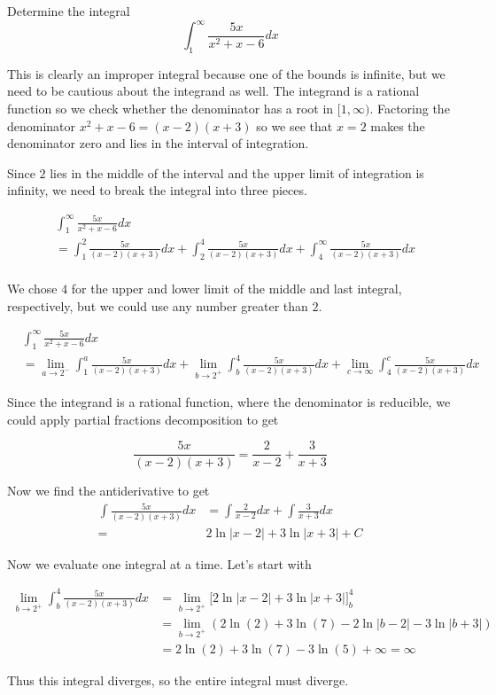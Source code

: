 \documentclass{ximera}
\begin{document}
\begin{example}
Determine the integral
\[
\int_{1}^{\infty} \frac{5x}{x^2+x-6} dx 
\]


\begin{explanation}
This is clearly an improper integral because one of the bounds is infinite, but we need to be cautious about the integrand as well. The integrand is a rational function so we check whether the denominator has a root in $[1,\infty)$.  Factoring the denominator $x^2+x-6=(x-2)(x+3)$ so we see that $x=2$ makes the denominator zero and lies in the interval of integration. 

Since $2$ lies in the middle of the interval and the upper limit of integration is infinity, we need to break the integral into three pieces.

\begin{align*}
& \int_{1}^{\infty} \frac{5x}{x^2+x-6} dx \\
&= \int_{1}^{2} \frac{5x}{(x-2)(x+3)} dx  + \int_{2}^{4} \frac{5x}{(x-2)(x+3)} dx + \int_{4}^{\infty} \frac{5x}{(x-2)(x+3)} dx\\
\end{align*}

We chose $4$ for the upper and lower limit of the middle and last integral, respectively, but we could use any number greater than $2$.

\begin{align*}
 & \int_{1}^{\infty} \frac{5x}{x^2+x-6} dx \\
        &=\lim_{a \to 2^{-}} \int_{1}^a \frac{5x}{(x-2)(x+3)} dx + \lim_{b \to 2^{+}} \int_{b}^{4} \frac{5x}{(x-2)(x+3)} dx +\lim_{c \to \infty} \int_{4}^{c} \frac{5x}{(x-2)(x+3)} dx
\end{align*}

Since the integrand is a rational function, where the denominator is reducible, we could apply partial fractions decomposition to get

\[
\frac{5x}{(x-2)(x+3)}=\frac{ 2}{x-2} +\frac{ 3}{x+3}
\]


Now we find the antiderivative to get 
\begin{align*}
\int \frac{5x}{(x-2)(x+3)} dx&=\int \frac{ 2}{x-2} dx + \int \frac{ 3}{x+3} dx \\
=& 2\ln|x-2| + 3\ln|x+3 | + C
\end{align*}


Now we evaluate one integral at a time.  Let's start with

\begin{align*}
\lim_{b \to 2^{+}} \int_{b}^{4} \frac{5x}{(x-2)(x+3)} dx&= \lim_{b \to 2^{+}} \bigg[ 2\ln|x-2| + 3\ln|x+3 | \bigg]_{b}^{4} \\
&=\lim_{b \to 2^{+}} (2\ln(2) + 3 \ln(7) - 2\ln|b-2| -3\ln|b+3| ) \\
&=2\ln(2) +3\ln(7)-3\ln(5) + \infty=\infty
\end{align*}

Thus this integral diverges, so the entire integral must diverge. 

\end{explanation}
\end{example}
\end{document}
